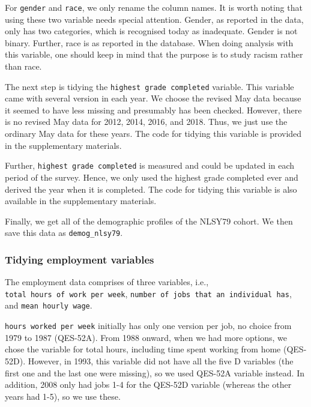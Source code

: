 \documentclass{article}
\begin{document}
For \texttt{gender} and \texttt{race}, we only rename the column names. It is worth noting that using these two variable needs special attention. Gender, as reported in the data, only has two categories, which is recognised today as inadequate. Gender is not binary. Further, race is as reported in the database. When doing analysis with this variable, one should keep in mind that the purpose is to study racism rather than race.

The next step is tidying the \texttt{highest\ grade\ completed} variable. This variable came with several version in each year. We choose the revised May data because it seemed to have less missing and presumably has been checked. However, there is no revised May data for 2012, 2014, 2016, and 2018. Thus, we just use the ordinary May data for these years. The code for tidying this variable is provided in the supplementary materials.

Further, \texttt{highest\ grade\ completed} is measured and could be updated in each period of the survey. Hence, we only used the highest grade completed ever and derived the year when it is completed. The code for tidying this variable is also available in the supplementary materials.

Finally, we get all of the demographic profiles of the NLSY79 cohort. We then save this data as \texttt{demog\_nlsy79}.

\hypertarget{tidying-employment-variables}{%
\subsubsection{Tidying employment variables}\label{tidying-employment-variables}}

The employment data comprises of three variables, i.e., \texttt{total\ hours\ of\ work\ per\ week}, \texttt{number\ of\ jobs\ that\ an\ individual\ has}, and \texttt{mean\ hourly\ wage}.

\texttt{hours\ worked\ per\ week} initially has only one version per job, no choice from 1979 to 1987 (QES-52A). From 1988 onward, when we had more options, we chose the variable for total hours, including time spent working from home (QES-52D). However, in 1993, this variable did not have all the five D variables (the first one and the last one were missing), so we used QES-52A variable instead. In addition, 2008 only had jobs 1-4 for the QES-52D variable (whereas the other years had 1-5), so we use these.
\end{document}
